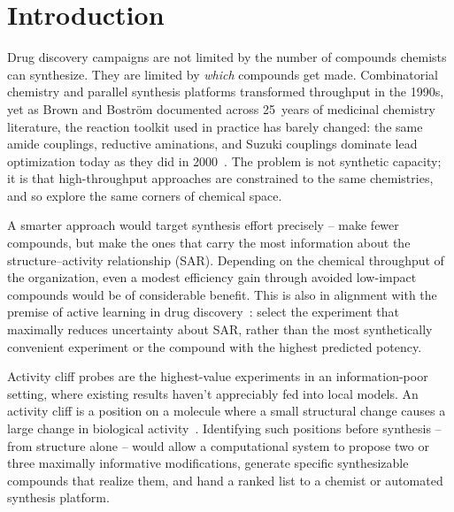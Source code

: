 \documentclass[sigconf, nonacm]{acmart}
\begin{document}
\maketitle

\section{Introduction}

Drug discovery campaigns are not limited by the number of compounds chemists can synthesize. They are limited by \textit{which} compounds get made. Combinatorial chemistry and parallel synthesis platforms transformed throughput in the 1990s, yet as Brown and Bostr\"{o}m documented across 25~years of medicinal chemistry literature, the reaction toolkit used in practice has barely changed: the same amide couplings, reductive aminations, and Suzuki couplings dominate lead optimization today as they did in 2000~\cite{Brown2016}. The problem is not synthetic capacity; it is that high-throughput approaches are constrained to the same chemistries, and so explore the same corners of chemical space.

A smarter approach would target synthesis effort precisely -- make fewer compounds, but make the ones that carry the most information about the structure--activity relationship (SAR). Depending on the chemical throughput of the organization, even a modest efficiency gain through avoided low-impact compounds would be of considerable benefit. This is also in alignment with the premise of active learning in drug discovery~\cite{Reker2015,Reker2020}: select the experiment that maximally reduces uncertainty about SAR, rather than the most synthetically convenient experiment or the compound with the highest predicted potency.

Activity cliff probes are the highest-value experiments in an information-poor setting, where existing results haven't appreciably fed into local models. An activity cliff is a position on a molecule where a small structural change causes a large change in biological activity~\cite{Guha2008,Maggiora2006}. Identifying such positions before synthesis -- from structure alone -- would allow a computational system to propose two or three maximally informative modifications, generate specific synthesizable compounds that realize them, and hand a ranked list to a chemist or automated synthesis platform.
\end{document}
